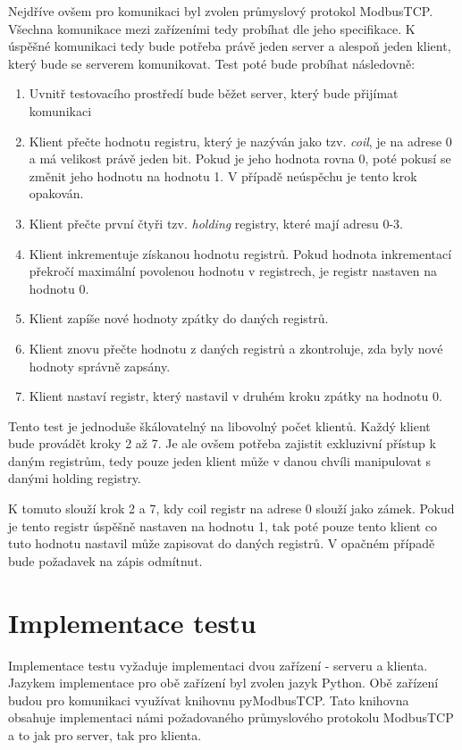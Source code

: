 Nejdříve ovšem pro komunikaci byl zvolen průmyslový protokol ModbusTCP.  Všechna komunikace mezi zařízeními tedy probíhat dle jeho specifikace. K úspěšné komunikaci tedy bude potřeba právě jeden server a alespoň jeden klient, který bude se serverem komunikovat. Test poté bude probíhat následovně:

\begin{enumerate}
    \item Uvnitř testovacího prostředí bude běžet server, který bude přijímat komunikaci
    \item Klient přečte hodnotu registru, který je nazýván jako tzv. \textit{coil}, je na adrese 0 a má velikost právě jeden bit. Pokud je jeho hodnota rovna 0, poté pokusí se změnit jeho hodnotu na hodnotu 1. V případě neúspěchu je tento krok opakován.
    \item Klient přečte první čtyři tzv. \textit{holding} registry, které mají adresu 0-3. 
    \item Klient inkrementuje získanou hodnotu registrů. Pokud hodnota inkrementací překročí maximální povolenou hodnotu v registrech, je registr nastaven na hodnotu 0.
    \item Klient zapíše nové hodnoty zpátky do daných registrů.
    \item Klient znovu přečte hodnotu z daných registrů a zkontroluje, zda byly nové hodnoty správně zapsány.
    \item Klient nastaví registr, který nastavil v druhém kroku zpátky na hodnotu 0.
\end{enumerate}

Tento test je jednoduše škálovatelný na libovolný počet klientů. Každý klient bude provádět kroky 2 až 7. Je ale ovšem potřeba zajistit exkluzivní přístup k daným registrům, tedy pouze jeden klient může v danou chvíli manipulovat s danými holding registry. 

K tomuto slouží krok 2 a 7, kdy coil registr na adrese 0 slouží jako zámek. Pokud je tento registr úspěšně nastaven na hodnotu 1, tak poté pouze tento klient co tuto hodnotu nastavil může zapisovat do daných registrů. V opačném případě bude požadavek na zápis odmítnut.

\section{Implementace testu}

Implementace testu vyžaduje implementaci dvou zařízení - serveru a klienta. Jazykem implementace pro obě zařízení byl zvolen jazyk Python. Obě zařízení budou pro komunikaci využívat knihovnu pyModbusTCP. Tato knihovna obsahuje implementaci námi požadovaného průmyslového protokolu ModbusTCP a to jak pro server, tak pro klienta.
 

